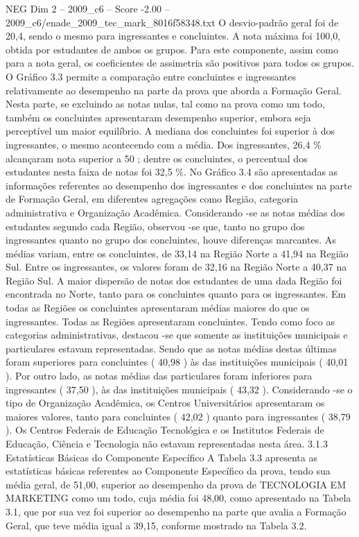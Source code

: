 \begin{textsample}{NEG Dim 2 – 2009\_c6 – Score -2.00 – 2009\_c6/enade\_2009\_tec\_mark\_8016f58348.txt}
O desvio-padrão geral foi de 20,4, sendo o mesmo para ingressantes e concluintes.
A nota máxima foi 100,0, obtida por estudantes de ambos os grupos.
Para este componente, assim como para a nota geral, os coeficientes de assimetria são positivos para todos os grupos.
O Gráfico 3.3 permite a comparação entre concluintes e ingressantes relativamente ao desempenho na parte da prova que aborda a Formação Geral.
Nesta parte, se excluindo as notas nulas, tal como na prova como um todo, também os concluintes apresentaram desempenho superior, embora seja perceptível um maior equilíbrio.
A mediana dos concluintes foi superior à dos ingressantes, o mesmo acontecendo com a média.
Dos ingressantes, 26,4 \% alcançaram nota superior a 50 ; dentre os concluintes, o percentual dos estudantes nesta faixa de notas foi 32,5 \%.
No Gráfico 3.4 são apresentadas as informações referentes ao desempenho dos ingressantes e dos concluintes na parte de Formação Geral, em diferentes agregações como Região, categoria administrativa e Organização Acadêmica.
Considerando -se as notas médias dos estudantes segundo cada Região, observou -se que, tanto no grupo dos ingressantes quanto no grupo dos concluintes, houve diferenças marcantes.
As médias variam, entre os concluintes, de 33,14 na Região Norte a 41,94 na Região Sul.
Entre os ingressantes, os valores foram de 32,16 na Região Norte a 40,37 na Região Sul.
A maior dispersão de notas dos estudantes de uma dada Região foi encontrada no Norte, tanto para os concluintes quanto para os ingressantes.
Em todas as Regiões os concluintes apresentaram médias maiores do que os ingressantes.
Todas as Regiões apresentaram concluintes.
Tendo como foco as categorias administrativas, destacou -se que somente as instituições municipais e particulares estavam representadas.
Sendo que as notas médias destas últimas foram superiores para concluintes ( 40,98 ) às das instituições municipais ( 40,01 ).
Por outro lado, as notas médias das particulares foram inferiores para ingressantes ( 37,50 ), às das instituições municipais ( 43,32 ).
Considerando -se o tipo de Organização Acadêmica, os Centros Universitários apresentaram os maiores valores, tanto para concluintes ( 42,02 ) quanto para ingressantes ( 38,79 ).
Os Centros Federais de Educação Tecnológica e os Institutos Federais de Educação, Ciência e Tecnologia não estavam representadas nesta área. 3.1.3 Estatísticas Básicas do Componente Específico A Tabela 3.3 apresenta as estatísticas básicas referentes ao Componente Específico da prova, tendo sua média geral, de 51,00, superior ao desempenho da prova de TECNOLOGIA EM MARKETING como um todo, cuja média foi 48,00, como apresentado na Tabela 3.1, que por sua vez foi superior ao desempenho na parte que avalia a Formação Geral, que teve média igual a 39,15, conforme mostrado na Tabela 3.2.

\end{textsample}
